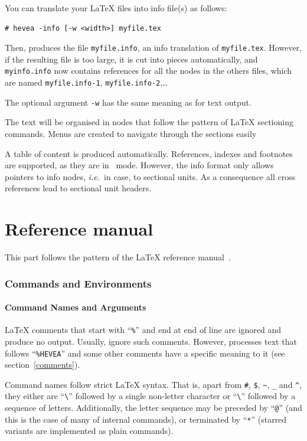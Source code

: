 You can translate your \LaTeX{} files into info file(s) as follows:
\begin{verbatim}
# hevea -info [-w <width>] myfile.tex
\end{verbatim}
Then, \hevea{} produces the file \texttt{myfile.info}, an info
translation of \texttt{myfile.tex}.
However, if the resulting  file is too large, it is cut into pieces
automatically,
and \texttt{myinfo.info} now contains references for all
the nodes in the others files, which are named \texttt{myfile.info-1},
\texttt{myfile.info-2},\ldots

The optional argument \verb+-w+ has the same meaning as for text output.

The text will be organised in nodes that follow
the pattern of \LaTeX{} sectioning
commands. Menus are created to navigate through the sections easily

A table of content is produced automatically.
References, indexes and footnotes are supported, as they are in
\html{}~mode.
However, the info format only allows pointers to info nodes,
\emph{i.e.}\ in \hevea{} case, to sectional units.
As a consequence all cross references lead to sectional unit headers.


\setcounter{section}{0}
\renewcommand{\thesection}{\thepart.\arabic{section}}
\cutend

\part{Reference manual}
\label{referencemanual}
This part follows the pattern of the \LaTeX{} reference
manual~\cite[Appendix~C]{latex}.

\section{Commands and Environments}

\subsection{Command Names and Arguments}

\LaTeX{} comments that start with ``\verb+%+'' %
and end at end of line are ignored and produce no output.
Usually, \hevea{} ignore such comments. However, \hevea{} processes
text that follows ``\verb+%HEVEA+'' %
and some other comments have a specific meaning to it (see
section~\ref{comments}).

Command names follow strict \LaTeX{} syntax. That is, apart from
\verb+#+, \verb+$+, %
\verb+~+, \verb+_+ and \verb+^+, they either are
``\verb+\+'' followed by a single non-letter character or
``\verb+\+'' followed by a sequence of letters.
Additionally, the letter sequence may be preceded by ``\verb+@+''
(and this is the case of many of \hevea{} internal commands), or
terminated by ``\verb+*+'' (starred variants are implemented as plain
commands).


